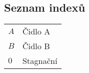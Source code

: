 \subsection*{Seznam indexů}
    \begin{table}[ht!]
        \begin{tabular}{P{.15\textwidth}|p{.75\textwidth}}
        $A$ & Čidlo A \\
        $B$ & Čidlo B \\
        $0$ & Stagnační
        \end{tabular}
    \end{table}

    \renewcommand{\arraystretch}{1}